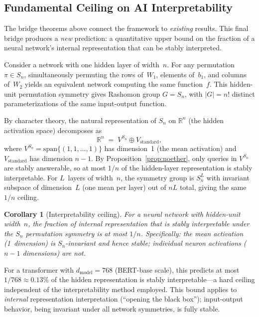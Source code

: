 \documentclass[11pt,a4paper]{article}
\newtheorem{corollary}[theorem]{Corollary}
\newcommand{\R}{\mathbb{R}}
\begin{document}
\subsection{Fundamental Ceiling on AI Interpretability}
\label{sec:bridge-interpretability}

The bridge theorems above connect the framework to \emph{existing} results.
This final bridge produces a \emph{new} prediction: a quantitative upper bound
on the fraction of a neural network's internal representation that can be
stably interpreted.

Consider a network with one hidden layer of width~$n$.  For any permutation
$\pi \in S_n$, simultaneously permuting the rows of~$W_1$, elements of~$b_1$,
and columns of~$W_2$ yields an equivalent network computing the same
function~$f$.  This hidden-unit permutation symmetry gives Rashomon group
$G = S_n$, with $|G| = n!$ distinct parameterizations of the same input-output
function.

By character theory, the natural representation of $S_n$ on $\R^n$
(the hidden activation space) decomposes as
\[
  \R^n \;=\; V^{S_n} \oplus V_{\text{standard}},
\]
where $V^{S_n} = \mathrm{span}\{(1,1,\ldots,1)\}$ has dimension~1 (the mean
activation) and $V_{\text{standard}}$ has dimension $n-1$.  By
Proposition~\ref{prop:noether}, only queries in $V^{S_n}$ are stably
answerable, so at most $1/n$ of the hidden-layer representation is stably
interpretable.  For $L$~layers of width~$n$, the symmetry group is $S_n^L$
with invariant subspace of dimension~$L$ (one mean per layer) out of $nL$
total, giving the same $1/n$ ceiling.

\begin{corollary}[Interpretability ceiling]
\label{cor:interp-ceiling}
For a neural network with hidden-unit width~$n$, the fraction of internal
representation that is stably interpretable under the $S_n$ permutation
symmetry is at most $1/n$.  Specifically: the mean activation (1~dimension) is
$S_n$-invariant and hence stable; individual neuron activations ($n-1$
dimensions) are not.
\end{corollary}

For a transformer with $d_{\text{model}} = 768$ (BERT-base scale), this
predicts at most $1/768 \approx 0.13\%$ of the hidden representation is
stably interpretable---a hard ceiling independent of the interpretability
method employed.  This bound applies to \emph{internal} representation
interpretation (``opening the black box''); input-output behavior, being
invariant under all network symmetries, is fully stable.
\end{document}
